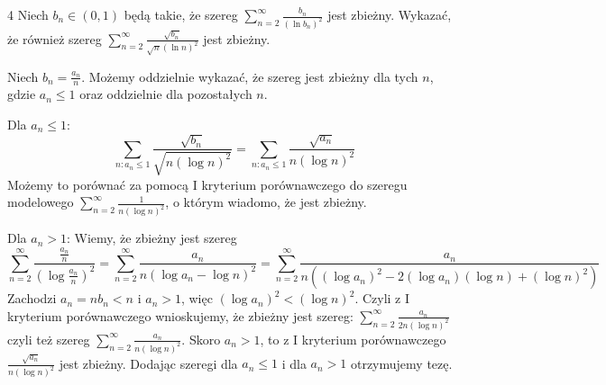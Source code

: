 \documentclass{../note}
\begin{document}
\begin{zadanie}{4}
Niech $b_{n}\in(0,1)$ będą takie, że szereg $\sum_{n=2}^{\infty}\frac{b_{n}}{(\ln b_{n})^{2}}$ jest zbieżny. Wykazać, że również szereg
$ \sum_{n=2}^{\infty}\frac{\sqrt{b_{n}}}{\sqrt{n}(\ln n)^{2}} $
jest zbieżny.
\end{zadanie}
\begin{rozwiazanie}
Niech $b_{n}=\frac{a_{n}}{n}$. Możemy oddzielnie wykazać, że szereg jest zbieżny dla tych $n$, gdzie $a_n \le 1$ oraz oddzielnie dla pozostałych $n$.

Dla $a_n \le 1$:
$$ \sum_{n:a_{n}\le1}\frac{\sqrt{b_{n}}}{\sqrt{n(\log n)^{2}}} = \sum_{n:a_{n}\le1}\frac{\sqrt{a_{n}}}{n(\log n)^{2}} $$
Możemy to porównać za pomocą I kryterium porównawczego do szeregu modelowego $\sum_{n=2}^{\infty}\frac{1}{n(\log n)^{2}}$, o którym wiadomo, że jest zbieżny.

Dla $a_n > 1$:
Wiemy, że zbieżny jest szereg 
$$ \sum_{n=2}^{\infty}\frac{\frac{a_{n}}{n}}{(\log \frac{a_n}{n})^{2}} = \sum_{n=2}^{\infty}\frac{a_{n}}{n(\log a_{n} - \log n)^{2}} = \sum_{n=2}^{\infty}\frac{a_{n}}{n((\log a_{n})^{2} - 2(\log a_{n})(\log n) + (\log n)^{2})} $$
Zachodzi $a_{n} = n b_{n} < n$ i $a_{n} > 1$, więc $(\log a_n)^{2} < (\log n)^{2}$. Czyli z I kryterium porównawczego wnioskujemy, że zbieżny jest szereg:
$ \sum_{n=2}^{\infty}\frac{a_{n}}{2n(\log n)^{2}} $
czyli też szereg $\sum_{n=2}^{\infty}\frac{a_{n}}{n(\log n)^{2}}$.
Skoro $a_{n} > 1$, to z I kryterium porównawczego $\frac{\sqrt{a_n}}{n(\log n)^2}$  jest zbieżny.
Dodając szeregi dla $a_n \le 1$ i dla $a_n > 1$ otrzymujemy tezę.
\end{rozwiazanie}
\end{document}
